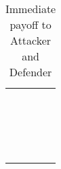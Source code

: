 \documentclass{acm_proc_article-sp}
\begin{document}
\begin{table}[htbp]
\centering
\scriptsize
\begin{tabular}{ll}\hline
           &  \\
                 &   \\
                 &\\
              &\\
          &\\
          &\\
          &\\
          &\\
          &\\
          &\\
          &\\
          &\\
          &\\
          &\\
          &\\
          &\\
                 &   \\
                 &   \\
\hline
\end{tabular}
\caption{\label{rewardcost} Immediate payoff to Attacker and Defender}
\end{table}
\end{document}
